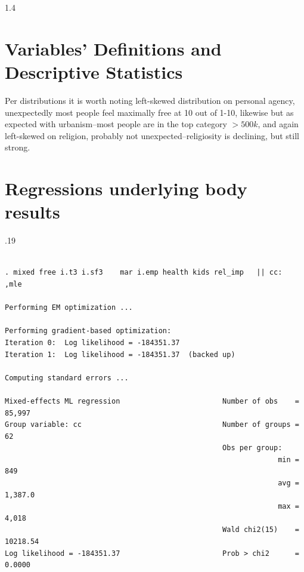 \documentclass[10pt, letterpaper]{article}
\begin{document}
\begin{spacing}{1.4}
\tableofcontents
{} 

\section{Variables' Definitions and  Descriptive Statistics}



Per distributions it is worth noting left-skewed distribution on personal agency,
unexpectedly most people feel maximally free at 10 out of 1-10, likewise but as expected with
urbanism--most people are in the top category $>500k$, and again left-skewed on
religion, probably not unexpected--religiosity is declining, but still
strong. 




\section{Regressions underlying body results}
\begin{scriptsize}
\begin{spacing}{.19} 
\begin{verbatim}

. mixed free i.t3 i.sf3    mar i.emp health kids rel_imp   || cc:   ,mle

Performing EM optimization ...

Performing gradient-based optimization: 
Iteration 0:  Log likelihood = -184351.37  
Iteration 1:  Log likelihood = -184351.37  (backed up)

Computing standard errors ...

Mixed-effects ML regression                        Number of obs    =   85,997
Group variable: cc                                 Number of groups =       62
                                                   Obs per group:
                                                                min =      849
                                                                avg =  1,387.0
                                                                max =    4,018
                                                   Wald chi2(15)    = 10218.54
Log likelihood = -184351.37                        Prob > chi2      =   0.0000


\end{verbatim}
\end{spacing}
\end{scriptsize}
\end{spacing}
\end{document}
